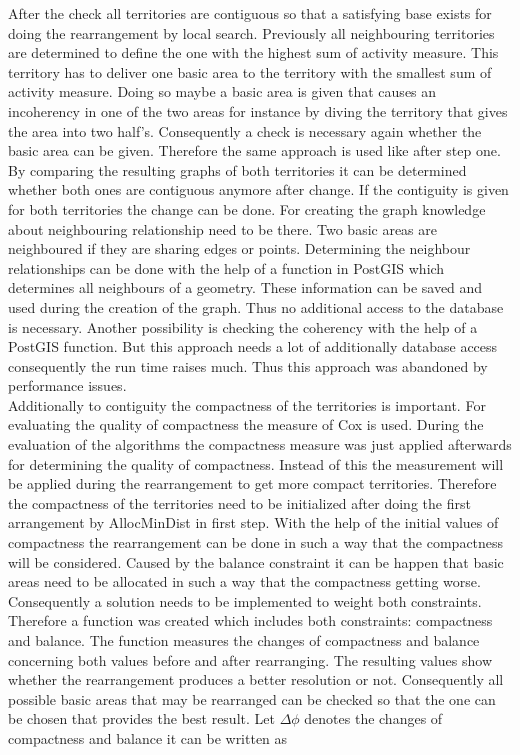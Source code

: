 After the check all territories are contiguous so that a satisfying base exists for doing the rearrangement by local search. Previously all neighbouring territories are determined to define the one with the highest sum of activity measure. This territory has to deliver one basic area to the territory with the smallest sum of activity measure. Doing so maybe a basic area is given that causes an incoherency in one of the two areas for instance by diving the territory that gives the area into two half's. Consequently a check is necessary again whether the basic area can be given. Therefore the same approach is used like after step one. By comparing the resulting graphs of both territories it can be determined whether both ones are contiguous anymore after change. If the contiguity is given for both territories the change can be done. For creating the graph knowledge about neighbouring relationship need to be there. Two basic areas are neighboured if they are sharing edges or points. Determining the neighbour relationships can be done with the help of a function in PostGIS which determines all neighbours of a geometry. These information can be saved and used during the creation of the graph. Thus no additional access to the database is necessary. Another possibility is checking the coherency with the help of a PostGIS function. But this approach needs a lot of additionally database access consequently the run time raises much. Thus this approach was abandoned by performance issues. \\
Additionally to contiguity the compactness of the territories is important. For evaluating the quality of compactness the measure of Cox is used. During the evaluation of the algorithms the compactness measure was just applied afterwards for determining the quality of compactness. Instead of this the measurement will be applied during the rearrangement to get more compact territories. Therefore the compactness of the territories need to be initialized after doing the first arrangement by AllocMinDist in first step. With the help of the initial values of compactness the rearrangement can be done in such a way that the compactness will be considered. Caused by the balance constraint it can be happen that basic areas need to be allocated in such a way that the compactness getting worse. Consequently a solution needs to be implemented to weight both constraints. Therefore a function was created which includes both constraints: compactness and balance. The function measures the changes of compactness and balance concerning both values before and after rearranging. The resulting values show whether the rearrangement produces a better resolution or not. Consequently all possible basic areas that may be rearranged can be checked so that the one can be chosen that provides the best result. Let $\Delta \phi $ denotes the changes of compactness and balance it can be written as

